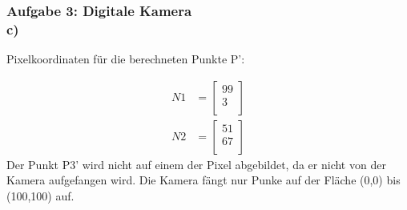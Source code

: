 \documentclass[accentcolor=tud9c,colorbacktitle,inverttitle,landscape,german,presentation,t]{tudbeamer}
\begin{document}
	\begin{frame}
		\frametitle{Aufgabe 3: Digitale Kamera \\ c)}
		
		Pixelkoordinaten f\"ur die berechneten Punkte P':
		
		\begin{align*}
		N1 &=
		\begin{bmatrix}
		99 \\
		3  \\
		\end{bmatrix}
		\end{align*}
		\begin{align*}
		N2 &=
		\begin{bmatrix}
		51 \\
		67  \\
		\end{bmatrix}
		\end{align*}
		Der Punkt P3' wird nicht auf einem der Pixel abgebildet, da er nicht von der Kamera aufgefangen wird. Die Kamera f\"angt nur Punke auf der Fl\"ache (0,0) bis (100,100) auf.
		
	\end{frame}
\end{document}
